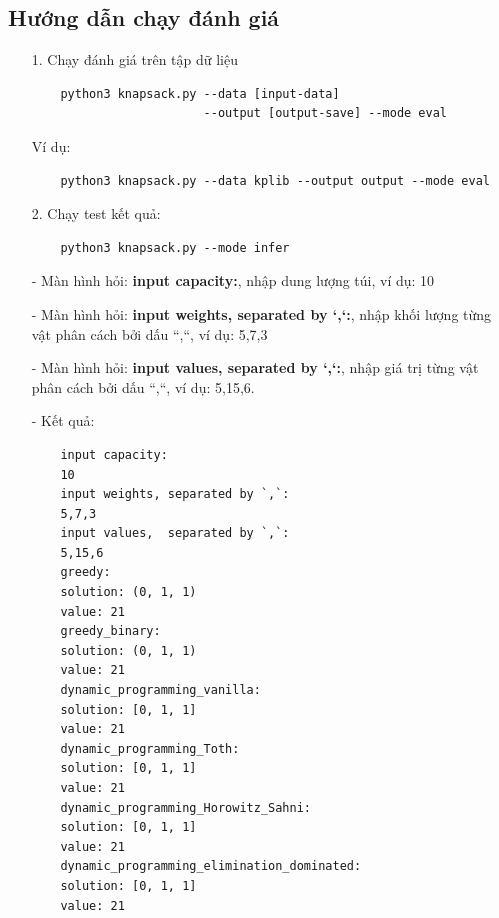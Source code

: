 \subsection{Hướng dẫn chạy đánh giá}
\begin{itemize}
    \item [1.] Chạy đánh giá trên tập dữ liệu
    \begin{verbatim}
    python3 knapsack.py --data [input-data]
                        --output [output-save] --mode eval
    \end{verbatim}

    Ví dụ:
    \begin{verbatim}
    python3 knapsack.py --data kplib --output output --mode eval
    \end{verbatim}

    \item [2.] Chạy test kết quả:
    \begin{verbatim}
    python3 knapsack.py --mode infer
    \end{verbatim}

    - Màn hình hỏi: \textbf{input capacity:}, nhập dung lượng túi, ví dụ: 10

    - Màn hình hỏi: \textbf{input weights, separated by `,`:}, nhập khối lượng từng vật phân cách bởi dấu ``,``, ví dụ: 5,7,3

    - Màn hình hỏi: \textbf{input values, separated by `,`:}, nhập giá trị từng vật phân cách bởi dấu ``,``, ví dụ: 5,15,6.

    - Kết quả:
    \begin{verbatim}
    input capacity:
    10          
    input weights, separated by `,`:
    5,7,3
    input values,  separated by `,`:
    5,15,6
    greedy:
    solution: (0, 1, 1)
    value: 21
    greedy_binary:
    solution: (0, 1, 1)
    value: 21
    dynamic_programming_vanilla:
    solution: [0, 1, 1]
    value: 21
    dynamic_programming_Toth:
    solution: [0, 1, 1]
    value: 21
    dynamic_programming_Horowitz_Sahni:
    solution: [0, 1, 1]
    value: 21
    dynamic_programming_elimination_dominated:
    solution: [0, 1, 1]
    value: 21
    \end{verbatim}
    
\end{itemize}